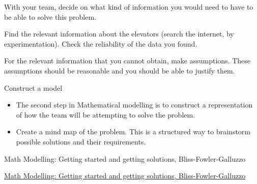 \begin{parts} 

	\item With your team, decide on what kind of information you would need to have to be able to solve this problem.

	\item Find the relevant information about the elevators (search the internet, by experimentation). Check the reliability of the data you found.

	\item For the relevant information that you cannot obtain, make assumptions. These assumptions should be reasonable and you should be able to justify them.
\end{parts}



















\newpage


%
%



\begin{module}{Construct a model}
	\label{model}

	
	
\end{module}



\begin{lesson}

	\begin{itemize}
		\item The second step in Mathematical modelling is to construct a representation of how the team will be attempting to solve the problem.
		\item Create a mind map of the problem. This is a structured way to brainstorm possible solutions and their requirements.
	\end{itemize}
	

\begin{annotation}
	\begin{goals}
	Math Modelling: Getting started and getting solutions, Bliss-Fowler-Galluzzo
	
	\hfill {}	
	\end{goals}
\end{annotation}
	 \href{https://m3challenge.siam.org/resources/modeling-handbook}{Math Modelling: Getting started and getting solutions, Bliss-Fowler-Galluzzo}

\end{lesson}




